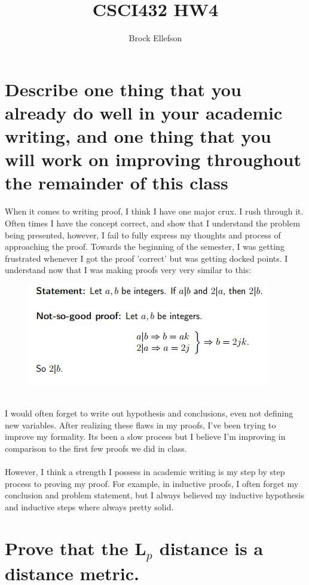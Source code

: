 \documentclass[10pt,letterpaper]{article}
\author{Brock Ellefson}
\title{CSCI432 HW4}
\begin{document}
\maketitle

\section{Describe one thing
that you already do well in your academic writing,
and one thing that you will work on improving
throughout the remainder of this class}

When it comes to writing proof, I think I have one major crux. I rush through it. Often times I have the concept correct, and show that I understand the problem being presented, however, I fail to fully express my thoughts and process of approaching the proof. Towards the beginning of the semester, I was getting frustrated whenever I got the proof 'correct' but was getting docked points. I understand now that I was making proofs very very similar to this:
\\
	\begin{figure}[h]
		\includegraphics[scale = .75]{badproof.png}
	\end{figure}
\\
I would often forget to write out hypothesis and conclusions, even not defining new variables. After realizing these flaws in my proofs, I've been trying to improve my  formality. Its been a slow process but I believe I'm improving in comparison to the first few proofs we did in class.\\
\\
However, I think a strength I possess in academic writing is my step by step process to proving my proof. For example, in inductive proofs, I often forget my conclusion and problem statement, but I always believed my inductive hypothesis and inductive steps where always pretty solid.

\section{ Prove that the L$_{p}$ distance is a distance metric.}
\end{document}
